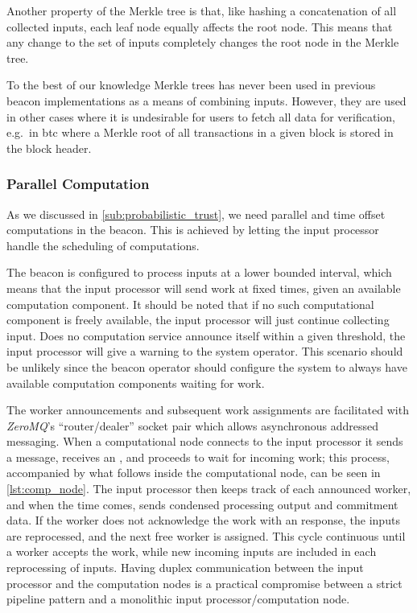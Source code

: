 Another property of the Merkle tree is that, like hashing a concatenation of all collected inputs, each leaf node equally affects the root node.
This means that any change to the set of inputs completely changes the root node in the Merkle tree.

To the best of our knowledge Merkle trees has never been used in previous beacon implementations as a means of combining inputs.
However, they are used in other cases where it is undesirable for users to fetch all data for verification, e.g.\ in \gls{btc} where a Merkle root of all transactions in a given block is stored in the block header.

\subsubsection{Parallel Computation}%
\label{ssub:parallel_computation}
As we discussed in \cref{sub:probabilistic_trust}, we need parallel and time offset computations in the beacon.
This is achieved by letting the input processor handle the scheduling of computations.

The beacon is configured to process inputs at a lower bounded interval, which means that the input processor will send work at fixed times, given an available computation component.
It should be noted that if no such computational component is freely available, the input processor will just continue collecting input.
Does no computation service announce itself within a given threshold, the input processor will give a warning to the system operator.
This scenario should be unlikely since the beacon operator should configure the system to always have available computation components waiting for work.

The worker announcements and subsequent work assignments are facilitated with \textit{ZeroMQ}'s \enquote{router/dealer} socket pair which allows asynchronous addressed messaging.
When a computational node connects to the input processor it sends a  message, receives an , and proceeds to wait for incoming work; this process, accompanied by what follows inside the computational node, can be seen in \cref{lst:comp_node}.
The input processor then keeps track of each announced worker, and when the time comes, sends condensed processing output and commitment data.
If the worker does not acknowledge the work with an  response, the inputs are reprocessed, and the next free worker is assigned.
This cycle continuous until a worker accepts the work, while new incoming inputs are included in each reprocessing of inputs.
Having duplex communication between the input processor and the computation nodes is a practical compromise between a strict pipeline pattern and a monolithic input processor/computation node.

